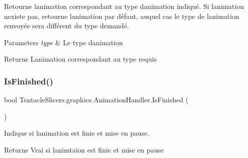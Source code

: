 Retourne l\textquotesingle{}animation correspondant au type d\textquotesingle{}animation indiqué. Si l\textquotesingle{}animation n\textquotesingle{}existe pas, retourne l\textquotesingle{}animation par défaut, auquel cas le type de l\textquotesingle{}animation renvoyée sera différent du type demandé. 


\begin{DoxyParams}{Parameters}
{\em type} & Le type d\textquotesingle{}animation \\
\hline
\end{DoxyParams}
\begin{DoxyReturn}{Returns}
L\textquotesingle{}animation correspondant au type requis 
\end{DoxyReturn}
\mbox{\label{class_tentacle_slicers_1_1graphics_1_1_animation_handler_a12a0833af42233820bdcecf6bcf92403}} 
\subsubsection{\texorpdfstring{Is\+Finished()}{IsFinished()}}
{\footnotesize\ttfamily bool Tentacle\+Slicers.\+graphics.\+Animation\+Handler.\+Is\+Finished (\begin{DoxyParamCaption}{ }\end{DoxyParamCaption})}



Indique si l\textquotesingle{}animation est finie et mise en pause. 

\begin{DoxyReturn}{Returns}
Vrai si l\textquotesingle{}animtaion est finie et mise en pause 
\end{DoxyReturn}
\mbox{\label{class_tentacle_slicers_1_1graphics_1_1_animation_handler_acaf5bb3839d75ef2238dab5bc37d70c4}} 

